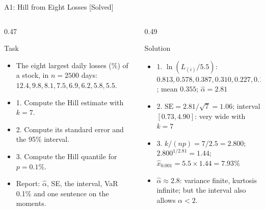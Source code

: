 \begin{frame}{A1: Hill from Eight Losses [Solved]}
\itemsize{\scriptsize}
\begin{columns}[T]
\begin{column}{0.47\textwidth}
\begin{block}{Task}
\begin{itemize}
    \item The eight largest daily losses (\%) of a stock, in $n = 2500$ days: $12.4, 9.8, 8.1, 7.5, 6.9, 6.2, 5.8, 5.5$.
    \item 1. Compute the Hill estimate with $k = 7$.
    \item 2. Compute its standard error and the 95\% interval.
    \item 3. Compute the Hill quantile for $p = 0.1\%$.
    \item Report: $\hat\alpha$, SE, the interval, VaR 0.1\% and one sentence on the moments.
\end{itemize}
\end{block}
\end{column}
\begin{column}{0.49\textwidth}
\begin{exampleblock}{Solution}
\begin{itemize}
    \item 1. $\ln(L_{(i)}/5.5)$: $0.813, 0.578, 0.387, 0.310, 0.227, 0.120, 0.053$; mean $0.355$; $\hat\alpha = 2.81$
    \item 2. $\mathrm{SE} = 2.81/\sqrt7 = 1.06$; interval $[0.73, 4.90]$: very wide with $k = 7$
    \item 3. $k/(np) = 7/2.5 = 2.800$; $2.800^{1/2.81} = 1.44$; $\hat x_{0.001} = 5.5 \times 1.44 = 7.93\%$
    \item $\hat\alpha \approx 2.8$: variance finite, kurtosis infinite; but the interval also allows $\alpha < 2$.
\end{itemize}
\end{exampleblock}
\end{column}
\end{columns}
\end{frame}

